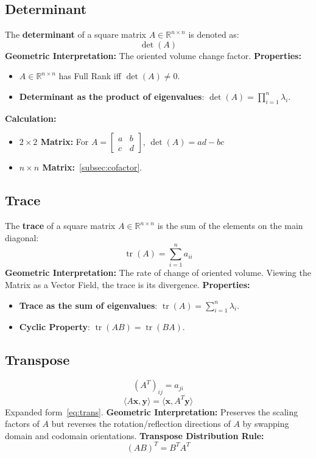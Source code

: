 \documentclass{article}
\begin{document}
\subsection{Determinant}
The \textbf{determinant} of a square matrix $A \in \mathbb{R}^{n \times n}$ is denoted as:
\[
    \det(A)
\]
\textbf{Geometric Interpretation:} The oriented volume change factor.
\newline
\textbf{Properties:}
\begin{itemize}
    \item $A \in \mathbb{R}^{n \times n}$ has Full Rank iff $\det(A) \neq 0$.
    \item \textbf{Determinant as the product of eigenvalues}: $\det(A) = \prod_{i=1}^n \lambda_i$.
\end{itemize}
\newline
\textbf{Calculation:}
\begin{itemize}
    \item \textbf{$2 \times 2$ Matrix:} For $A = \begin{bmatrix} a & b \\ c & d \end{bmatrix}$, $\det(A) = ad - bc$
    \item \textbf{$n \times n$ Matrix:}~\ref{subsec:cofactor}.
\end{itemize}

\subsection{Trace}
The \textbf{trace} of a square matrix $A \in \mathbb{R}^{n \times n}$ is the sum of the elements on the main diagonal:
\[
    \operatorname{tr}(A) = \sum_{i=1}^n a_{ii}
\]
\textbf{Geometric Interpretation:} The rate of change of oriented volume. Viewing the Matrix as a Vector Field, the trace is its divergence.
\newline
\textbf{Properties:}
\begin{itemize}
    \item \textbf{Trace as the sum of eigenvalues}: $\operatorname{tr}(A) = \sum_{i=1}^n \lambda_i$.
    \item \textbf{Cyclic Property}: $\operatorname{tr}(AB) = \operatorname{tr}(BA)$.
\end{itemize}

\subsection{Transpose}
\[
    (A^T)_{ij} = a_{ji}
\]
\[
    \langle A\mathbf{x}, \mathbf{y} \rangle = \langle \mathbf{x}, A^T\mathbf{y} \rangle
\]
Expanded form~\ref{eq:trans}.
\newline
\textbf{Geometric Interpretation:} Preserves the scaling factors of $A$ but reverses the rotation/reflection directions of $A$ by swapping domain and codomain orientations.
\newline
\textbf{Transpose Distribution Rule:}
\[
    (AB)^T = B^T A^T
\]
\end{document}
